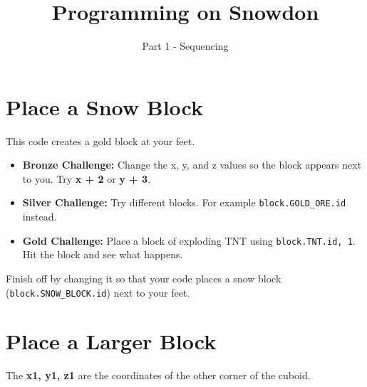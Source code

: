 \documentclass{geocraft-worksheet}
\begin{document}
\title{Programming on Snowdon}
\subtitle{Part 1 - Sequencing}

\maketitle


\section{Place a Snow Block}\vspace{-0.5cm}
\lstset{language=Python}

\noindent%
%
\vspace{0.2cm}
%
%

\noindent This code creates a gold block at your feet.\\

\begin{itemize}
\item\textbf{Bronze Challenge:} Change the x, y, and z values so the block
appears next to you. \newline Try \textbf{x + 2} or \textbf{y + 3}. 

\item\textbf{Silver Challenge:} Try different blocks. For example
\lstinline{block.GOLD_ORE.id} instead. 

\item\textbf{Gold Challenge:} Place a block of exploding TNT using
\lstinline{block.TNT.id, 1}. Hit the block and see what happens.
\end{itemize}

\noindent Finish off by changing it so that your code places a snow block
(\lstinline{block.SNOW_BLOCK.id}) next to your feet.

\section{Place a Larger Block}\vspace{-0.5cm}

\noindent%
%
\vspace{0.2cm}
%
%

\noindent The \textbf{x1, y1, z1} are the coordinates of the other corner of the
cuboid. \\
\end{document}
